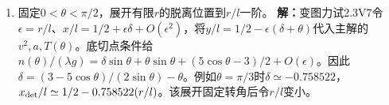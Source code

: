 \documentclass[UTF8,fontset=fandol,a4paper,11pt]{ctexart}
\begin{document}
\begin{enumerate}
\item 固定$0<\theta<\pi/2$，展开有限$r$的脱离位置到$r/l$一阶。
\textbf{解：}变图力试2.3V7令$\epsilon=r/l$、$x/l=1/2+\epsilon\delta+O(\epsilon^2)$，将$y/l=1/2-\epsilon(\delta+\theta)$代入主解的$v^2,a,T(\theta)$。底切点条件给$n(\theta)/(\lambda g)=\delta\sin\theta+\theta\sin\theta+(5\cos\theta-3)/2+O(\epsilon)$。因此$\delta=(3-5\cos\theta)/(2\sin\theta)-\theta$。例如$\theta=\pi/3$时$\delta\simeq-0.758522$，$x_{\rm det}/l\simeq1/2-0.758522(r/l)$。该展开固定转角后令$r/l$变小。
\begin{center}\begin{minipage}{.98\linewidth}\centering
{}
\end{minipage}
\end{center}
\end{enumerate}
\end{document}
